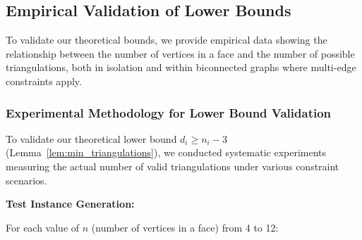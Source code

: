\documentclass[12pt,a4paper]{article}
\theoremstyle{definition}
\theoremstyle{remark}
\begin{document}
\subsection{Empirical Validation of Lower Bounds}

To validate our theoretical bounds, we provide empirical data showing the relationship between the number of vertices in a face and the number of possible triangulations, both in isolation and within biconnected graphs where multi-edge constraints apply.

\subsubsection{Experimental Methodology for Lower Bound Validation}

To validate our theoretical lower bound $d_i \geq n_i - 3$ (Lemma~\ref{lem:min_triangulations}), we conducted systematic experiments measuring the actual number of valid triangulations under various constraint scenarios.

\textbf{Test Instance Generation:}

For each value of $n$ (number of vertices in a face) from 4 to 12:
\end{document}
